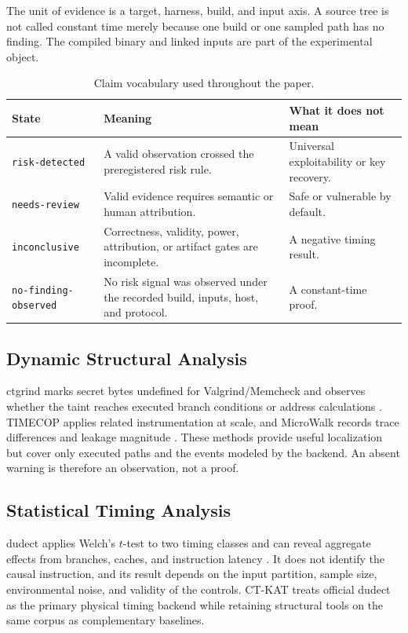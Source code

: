 \documentclass[cryptography,article,submit,moreauthors]{Definitions/mdpi}
\newcommand{\evidence}[1]{\texttt{#1}}
\begin{document}
The unit of evidence is a target, harness, build, and input axis. A source tree
is not called constant time merely because one build or one sampled path has no
finding. The compiled binary and linked inputs are part of the experimental
object.

\begin{table}[H]
\caption{Claim vocabulary used throughout the paper.\label{tab:claim-vocabulary}}
\begin{tabularx}{\textwidth}{LLL}
\toprule
\textbf{State} & \textbf{Meaning} & \textbf{What it does not mean}\\
\midrule
\evidence{risk-detected} & A valid observation crossed the preregistered risk rule. & Universal exploitability or key recovery.\\
\evidence{needs-review} & Valid evidence requires semantic or human attribution. & Safe or vulnerable by default.\\
\evidence{inconclusive} & Correctness, validity, power, attribution, or artifact gates are incomplete. & A negative timing result.\\
\evidence{no-finding-observed} & No risk signal was observed under the recorded build, inputs, host, and protocol. & A constant-time proof.\\
\bottomrule
\end{tabularx}
\end{table}

\subsection{Dynamic Structural Analysis}

ctgrind marks secret bytes undefined for Valgrind/Memcheck and observes whether
the taint reaches executed branch conditions or address calculations
\citep{langley2010ctgrind}. TIMECOP applies related instrumentation at scale,
and MicroWalk records trace differences and leakage magnitude
\citep{bernstein2024report,wichelmann2018microwalk}. These methods provide
useful localization but cover only executed paths and the events modeled by
the backend. An absent warning is therefore an observation, not a proof.

\subsection{Statistical Timing Analysis}

dudect applies Welch's $t$-test to two timing classes and can reveal aggregate
effects from branches, caches, and instruction latency
\citep{reparaz2017dude,gilbert2011testing}. It does not identify the causal
instruction, and its result depends on the input partition, sample size,
environmental noise, and validity of the controls. CT-KAT treats official
dudect as the primary physical timing backend while retaining structural tools
on the same corpus as complementary baselines.
\end{document}
